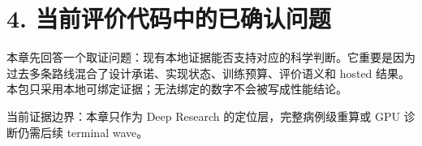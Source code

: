 \section{4. 当前评价代码中的已确认问题}

本章先回答一个取证问题：现有本地证据能否支持对应的科学判断。它重要是因为过去多条路线混合了设计承诺、实现状态、训练预算、评价语义和 hosted 结果。本包只采用本地可绑定证据；无法绑定的数字不会被写成性能结论。



当前证据边界：本章只作为 Deep Research 的定位层，完整病例级重算或 GPU 诊断仍需后续 terminal wave。



\clearpage